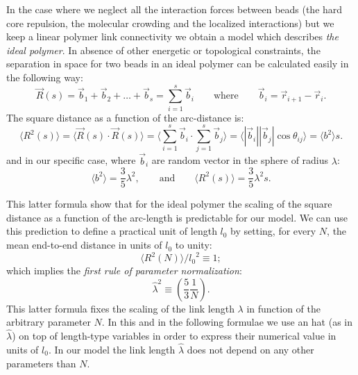 \documentclass[12pt,a4paper,notitlepage]{article}
\begin{document}
In the case where we neglect all the interaction forces between beads
(the hard core repulsion, the molecular crowding and the localized 
interactions) but we keep a linear polymer link connectivity we obtain
a model which describes {\it the ideal polymer}. In
absence of other energetic or topological constraints, the separation
in space for two beads in an ideal polymer can be calculated easily in
the following way:
\begin{equation}
  \vec R(s) = \vec b_1 + \vec b_2 + \dots + \vec b_s = \sum_{i=1}^s
  \vec b_i \qquad \mathrm{where} \qquad \vec b_i = \vec r_{i+1} - 
  \vec r_i.
\label{eq:idealbees}
\end{equation}
The square distance as a function of the arc-distance is:
\begin{equation}
  \langle  R^2(s) \rangle = \langle \vec R(s) \cdot \vec R(s) \rangle
  = \langle \sum_{i=1}^s \vec b_i \cdot \sum_{j=1}^s \vec b_j \rangle
  = \langle | \vec b_i || \vec b_j | \cos \theta_{ij} \rangle
  = \langle b^2 \rangle s.
\label{eq:idealettoe}
\end{equation}
and in our specific case, where $\vec b_i$ are random vector in the
sphere of radius $\lambda$:
\begin{equation}
  \langle b^2 \rangle = \frac{3}{5}\lambda^2, \qquad \mathrm{and}
  \qquad \langle  R^2(s) \rangle = \frac{3}{5} \lambda^2 s.
  \label{eq:elldef}
\end{equation}

This latter formula show that for the ideal polymer the scaling of the
square distance as a function of the arc-length is predictable for our
model.
We can use this prediction to define a practical unit of length $l_0$
by setting, for every $N$, the mean end-to-end
distance in units of $l_0$ to unity:
\begin{equation}
  \langle R^2(N) \rangle / {l_0}^2 \equiv 1;
\label{eq:lzerodef}
\end{equation}
which implies the {\it first rule of parameter normalization}:
\begin{equation}
\hat \lambda^2 \equiv \left( \frac{5}{3}\frac{1}{N} \right).
\label{eq:lambdadef}
\end{equation}
This latter formula fixes the scaling of the link length $\lambda$ in
function of the arbitrary parameter $N$. In this and in the following
formulae we use an hat (as in $\hat \lambda$) on top of length-type
variables in order to express their numerical value in units of
$l_0$. In our model the link length $\hat \lambda$ does not depend on
any other parameters than $N$.
\end{document}
